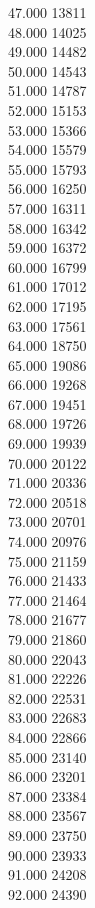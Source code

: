 { 47.000	13811 \\
 48.000	14025 \\
 49.000	14482 \\
 50.000	14543 \\
 51.000	14787 \\
 52.000	15153 \\
 53.000	15366 \\
 54.000	15579 \\
 55.000	15793 \\
 56.000	16250 \\
 57.000	16311 \\
 58.000	16342 \\
 59.000	16372 \\
 60.000	16799 \\
 61.000	17012 \\
 62.000	17195 \\
 63.000	17561 \\
 64.000	18750 \\
 65.000	19086 \\
 66.000	19268 \\
 67.000	19451 \\
 68.000	19726 \\
 69.000	19939 \\
 70.000	20122 \\
 71.000	20336 \\
 72.000	20518 \\
 73.000	20701 \\
 74.000	20976 \\
 75.000	21159 \\
 76.000	21433 \\
 77.000	21464 \\
 78.000	21677 \\
 79.000	21860 \\
 80.000	22043 \\
 81.000	22226 \\
 82.000	22531 \\
 83.000	22683 \\
 84.000	22866 \\
 85.000	23140 \\
 86.000	23201 \\
 87.000	23384 \\
 88.000	23567 \\
 89.000	23750 \\
 90.000	23933 \\
 91.000	24208 \\
 92.000	24390 \\
}
